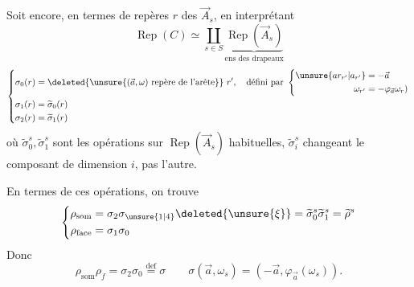 Soit encore, en termes de repères $r$ des $\vec A_s$, en interprétant
\[
\operatorname{Rep}(C)\simeq\coprod_{s\in S}\underbrace{\operatorname{Rep}(\vec A_s)}_{\text{ens des drapeaux}}
\]
\[
\left\{\begin{aligned}
\sigma_0(r)&=\deleted{\unsure{(\vec a,\omega)\text{ repère de l'arête}}}\ r',\quad\text{défini par }\left\{\begin{aligned}\unsure{ar_{r'}|a_{r'}}&=-\vec a\\\omega_{r'}&=-\varphi_{\vec a}\omega_r)\end{aligned}\right.\\
\sigma_1(r)&=\widetilde\sigma_0(r)\\
\sigma_2(r)&=\widetilde\sigma_1(r)
\end{aligned}\right.
\]
où $\widetilde\sigma_0^s,\widetilde\sigma_1^s$ sont les opérations sur $\operatorname{Rep}(\vec A_s)$ habituelles, $\widetilde\sigma_i^s$ changeant le composant  de dimension $i$, pas l'autre.

En termes de ces opérations, on trouve
\[
\left\{\begin{aligned}
\rho_{\mathrm{som}}&=\sigma_2\sigma_{\unsure{1|4}}\deleted{\unsure{\xi}}=\widetilde\sigma_0^s\widetilde\sigma_1^s=\widetilde\rho^s\\
\rho_{\mathrm{face}}&=\sigma_1\sigma_0
\end{aligned}\right.
\]
Donc
\[
\rho_{\mathrm{som}}\rho_f=\sigma_2\sigma_0\overset{\mathrm{def}}=\sigma
\qquad\sigma(\vec a,\omega_s)=(-\vec a,\varphi_{\vec a}(\omega_s)).
\]

